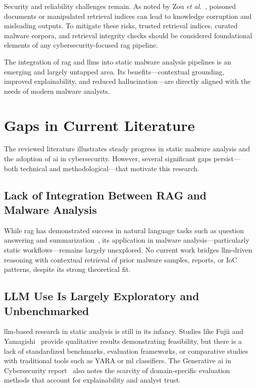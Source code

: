 Security and reliability challenges remain. As noted by Zou \emph{et
	al.}~\cite{zou2024poisonedrag}, poisoned documents or manipulated retrieval indices can lead to
knowledge corruption and misleading outputs. To mitigate these risks, trusted retrieval indices,
curated malware corpora, and retrieval integrity checks should be considered foundational elements
of any cybersecurity-focused \gls{rag} pipeline.

The integration of \gls{rag} and \glspl{llm} into static malware analysis pipelines is an emerging
and largely untapped area. Its benefits—contextual grounding, improved explainability, and reduced
hallucination—are directly aligned with the needs of modern malware analysts.

\section{Gaps in Current Literature}\label{sec:LiteratureGaps}
The reviewed literature illustrates steady progress in static malware analysis and the adoption of
\gls{ai} in cybersecurity. However, several significant gaps persist—both technical and
methodological—that motivate this research.

\subsection{Lack of Integration Between RAG and Malware Analysis}\label{subsec:LiteratureGaps-RAGIntegration}
While \gls{rag} has demonstrated success in natural language tasks such as question answering and
summarization~\cite{lewis2020retrieval, gao2023retrieval}, its application in malware
analysis—particularly static workflows—remains largely unexplored. No current work bridges
\gls{llm}-driven reasoning with contextual retrieval of prior malware samples, reports, or IoC
patterns, despite its strong theoretical fit.

\subsection{LLM Use Is Largely Exploratory and Unbenchmarked}\label{subsec:LiteratureGaps-LLMBenchmarking}
\gls{llm}-based research in static analysis is still in its infancy. Studies
like Fujii and Yamagishi~\cite{fujii2024llm} provide qualitative results
demonstrating feasibility, but there is a lack of standardized benchmarks,
evaluation frameworks, or comparative studies with traditional tools such as
YARA or \gls{ml} classifiers. The Generative \gls{ai} in Cybersecurity
report~\cite{metta2024generativeai} also notes the scarcity of domain-specific
evaluation methods that account for explainability and analyst trust.

